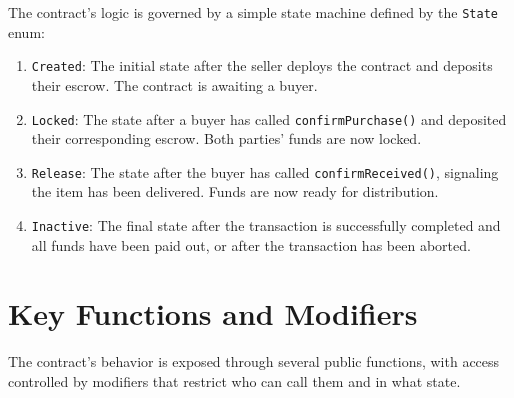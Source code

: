 \documentclass{scrbook}
\begin{document}
The contract's logic is governed by a simple state machine defined by the \texttt{State} enum:

\begin{enumerate}
    \item
    \texttt{Created}: The initial state after the seller deploys the contract and deposits their escrow. The contract is awaiting a buyer.
    
    \item
    \texttt{Locked}: The state after a buyer has called \texttt{confirmPurchase()} and deposited their corresponding escrow. Both parties' funds are now locked.
    
    \item
    \texttt{Release}: The state after the buyer has called \texttt{confirmReceived()}, signaling the item has been delivered. Funds are now ready for distribution.
    
    \item
    \texttt{Inactive}: The final state after the transaction is successfully completed and all funds have been paid out, or after the transaction has been aborted.
\end{enumerate}

\section{Key Functions and Modifiers}

The contract's behavior is exposed through several public functions, with access controlled by modifiers that restrict who can call them and in what state.\\
\end{document}
